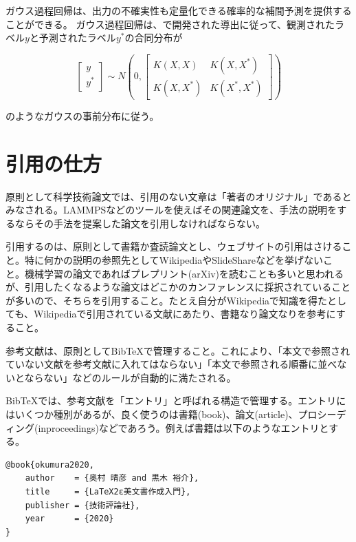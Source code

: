 \documentclass[titlepage]{jsreport}
\begin{document}
ガウス過程回帰は、出力の不確実性も定量化できる確率的な補間予測を提供する\cite{machine-learning}ことができる。
ガウス過程回帰は、\cite{Gaussian-Processes-for-Machine-Learning}で開発された導出に従って、観測されたラベル$y$と予測されたラベル$y^*$の合同分布が

\large
\[
    \left[
        \begin{array}{l}
            y \\
            y^* 
        \end{array}
    \right]
    {\sim} N
    \left(0,
        \left[
            \begin{array}{cc}
                K(X,X) & K(X,X^*)\\    
                K(X,X^*) & K(X^*,X^*)
            \end{array}
        \right]
    \right)
\]
\normalsize

のようなガウスの事前分布に従う。


\section{引用の仕方}

原則として科学技術論文では、引用のない文章は「著者のオリジナル」であるとみなされる。LAMMPSなどのツールを使えばその関連論文を、手法の説明をするならその手法を提案した論文を引用しなければならない。

引用するのは、原則として書籍か査読論文とし、ウェブサイトの引用はさけること。特に何かの説明の参照先としてWikipediaやSlideShareなどを挙げないこと。機械学習の論文であればプレプリント(arXiv)を読むことも多いと思われるが、引用したくなるような論文はどこかのカンファレンスに採択されていることが多いので、そちらを引用すること。たとえ自分がWikipediaで知識を得たとしても、Wikipediaで引用されている文献にあたり、書籍なり論文なりを参考にすること。

参考文献は、原則としてBibTeXで管理すること。これにより、「本文で参照されていない文献を参考文献に入れてはならない」「本文で参照される順番に並べないとならない」などのルールが自動的に満たされる。

BibTeXでは、参考文献を「エントリ」と呼ばれる構造で管理する。エントリにはいくつか種別があるが、良く使うのは書籍(book)、論文(article)、プロシーディング(inproceedings)などであろう。例えば書籍は以下のようなエントリとする。

\begin{lstlisting}[language=TeX]
@book{okumura2020,
    author    = {奥村 晴彦 and 黒木 裕介},
    title     = {LaTeX2ε美文書作成入門},
    publisher = {技術評論社},
    year      = {2020}
}
\end{lstlisting}
\end{document}
